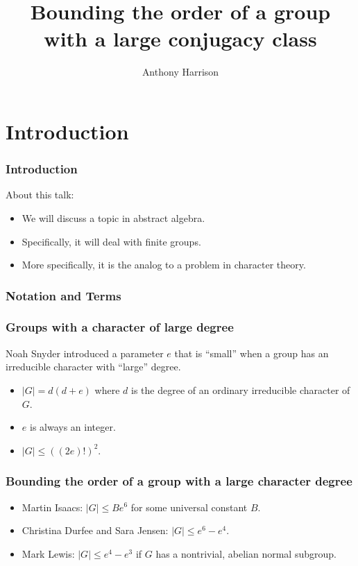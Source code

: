 \documentclass{beamer}
\title{Bounding the order of a group with a large conjugacy class}
\author{Anthony Harrison}
\institute{Texas State University-San Marcos}
\begin{document}
\begin{frame}
\titlepage
\end{frame}

\section{Introduction}

\begin{frame}
\frametitle{Introduction}
About this talk:
\begin{itemize}
	\item We will discuss a topic in abstract algebra.
	\item Specifically, it will deal with finite groups.
	\item More specifically, it is the analog to a problem in character theory.
\end{itemize}
\end{frame}

\begin{frame}
\frametitle{Notation and Terms}
\end{frame}

\begin{frame}
\frametitle{Groups with a character of large degree}
Noah Snyder introduced a parameter $e$ that is ``small'' when a group has an irreducible character with ``large'' degree.
\begin{itemize}
	\item<1-> $|G| = d(d+e)$ where $d$ is the degree of an ordinary irreducible character of $G$.
	\item<2-> $e$ is always an integer.
	\item<3-> $|G| \le ((2e)!)^2$.
\end{itemize}
\end{frame}

\begin{frame}
\frametitle{Bounding the order of a group with a large character degree}
\begin{itemize}
	\item Martin Isaacs: $|G| \le Be^6$ for some universal constant $B$.
	\item Christina Durfee and Sara Jensen: $|G| \le e^6 - e^4$.
	\item Mark Lewis: $|G| \le e^4 - e^3$ if $G$ has a nontrivial, abelian normal subgroup.
\end{itemize}
\end{frame}
\end{document}
